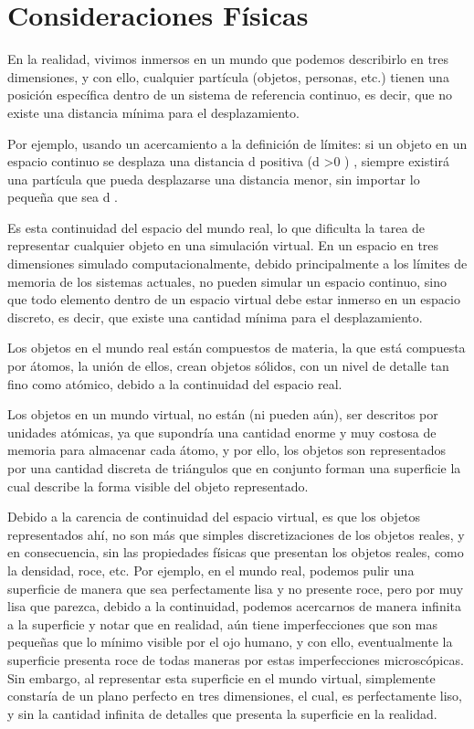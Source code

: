 \section{Consideraciones Físicas}
\label{sec:consideracionesFisicas}
En la realidad, vivimos inmersos en un mundo que podemos describirlo en tres
dimensiones, y con ello, cualquier partícula (objetos, personas, etc.) tienen una posición
específica dentro de un sistema de referencia continuo, es decir, que no existe una distancia
mínima para el desplazamiento.

Por ejemplo, usando un acercamiento a la definición de límites: si un objeto en un espacio
continuo se desplaza una distancia  d  positiva  (d >0 ) , siempre existirá una partícula que
pueda desplazarse una distancia menor, sin importar lo pequeña que sea  d .

Es esta continuidad del espacio del mundo real, lo que dificulta la tarea de representar
cualquier objeto en una simulación virtual.
En un espacio en tres dimensiones simulado computacionalmente, debido principalmente
a los límites de memoria de los sistemas actuales, no pueden simular un espacio continuo, sino
que todo elemento dentro de un espacio virtual debe estar inmerso en un espacio discreto, es
decir, que existe una cantidad mínima para el desplazamiento.

Los objetos en el mundo real están compuestos de materia, la que está compuesta por
átomos, la unión de ellos, crean objetos sólidos, con un nivel de detalle tan fino como atómico,
debido a la continuidad del espacio real.

Los objetos en un mundo virtual, no están (ni pueden aún), ser descritos por unidades
atómicas, ya que supondría una cantidad enorme y muy costosa de memoria para almacenar cada
átomo, y por ello, los objetos son representados por una cantidad discreta de triángulos que en
conjunto forman una superficie la cual describe la forma visible del objeto representado.

Debido a la carencia de continuidad del espacio virtual, es que los objetos representados
ahí, no son más que simples discretizaciones de los objetos reales, y en consecuencia, sin las
propiedades físicas que presentan los objetos reales, como la densidad, roce, etc.
Por ejemplo, en el mundo real, podemos pulir una superficie de manera que sea
perfectamente lisa y no presente roce, pero por muy lisa que parezca, debido a la continuidad,
podemos acercarnos de manera infinita a la superficie y notar que en realidad, aún tiene
imperfecciones que son mas pequeñas que lo mínimo visible por el ojo humano, y con ello,
eventualmente la superficie presenta roce de todas maneras por estas imperfecciones
microscópicas. Sin embargo, al representar esta superficie en el mundo virtual, simplemente
constaría de un plano perfecto en tres dimensiones, el cual, es perfectamente liso, y sin la
cantidad infinita de detalles que presenta la superficie en la realidad.

